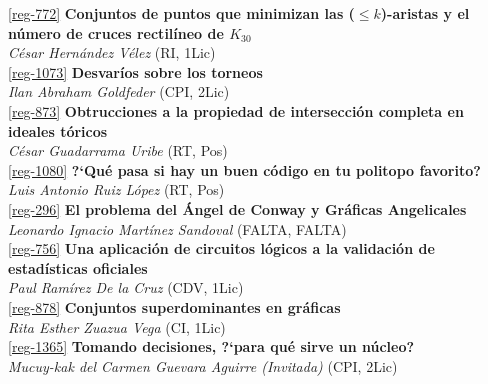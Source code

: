 \begin{multicols}{2}
\raggedcolumns

\noindent  \ref{reg-772}  {\bfseries Conjuntos de puntos que minimizan las ($\leq\!k$)-aristas y el n\'umero de cruces rectil\'ineo de $K_{30}$}\\
{\slshape  C\'esar  Hern\'andez V\'elez} {\footnotesize (RI, 1Lic)}\\

\noindent  \ref{reg-1073}  {\bfseries Desvar\'ios sobre los torneos}\\
{\slshape  Ilan Abraham Goldfeder} {\footnotesize (CPI, 2Lic)}\\

\noindent  \ref{reg-873}  {\bfseries Obtrucciones a la propiedad de intersecci\'on completa en ideales t\'oricos}\\
{\slshape  C\'esar  Guadarrama Uribe} {\footnotesize (RT, Pos)}\\

\noindent  \ref{reg-1080}  {\bfseries ?`Qu\'e pasa si hay un buen c\'odigo en tu politopo favorito?}\\
{\slshape  Luis Antonio Ruiz L\'opez} {\footnotesize (RT, Pos)}\\

\noindent  \ref{reg-296}  {\bfseries El problema del \'Angel de Conway y Gr\'aficas Angelicales}\\
{\slshape  Leonardo Ignacio Mart\'inez Sandoval} {\footnotesize (FALTA, FALTA)}\\

\noindent  \ref{reg-756}  {\bfseries Una aplicaci\'on de circuitos l\'ogicos a la validaci\'on de estad\'isticas oficiales}\\
{\slshape  Paul  Ram\'irez De la Cruz} {\footnotesize (CDV, 1Lic)}\\

\noindent  \ref{reg-878}  {\bfseries Conjuntos superdominantes en gr\'aficas}\\
{\slshape  Rita Esther Zuazua Vega} {\footnotesize (CI, 1Lic)}\\

\noindent  \ref{reg-1365}  {\bfseries Tomando decisiones, ?`para qu\'e sirve un n\'ucleo?}\\
{\slshape  Mucuy-kak del Carmen Guevara Aguirre (Invitada)} {\footnotesize (CPI, 2Lic)}\\


\end{multicols}
